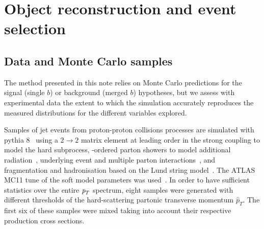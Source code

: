 %
%

\chapter{Object reconstruction and event selection}

\section{Data and Monte Carlo samples}\label{sec:Simulation}


The method presented in this note relies on Monte Carlo predictions for the signal (single $b$) or background (merged $b$) hypotheses, but we assess with experimental data the extent to which the simulation accurately reproduces the measured distributions for the different variables explored.

Samples of jet events from proton-proton collisions processes are simulated with {\sc pythia 8}~\cite{PYTHIA8} using a $2\rightarrow 2$ matrix element at leading order in the strong coupling to model the hard subprocess, \pt-ordered parton showers to model additional radiation~\cite{Pythia_partonshowers}, underlying event and multiple parton interactions~\cite{Pythia_mpi}, and fragmentation and hadronisation based on the Lund string model~\cite{Lund_string_model}. 
The ATLAS MC11 tune of the soft model parameters was used~\cite{Pythia_MC11tune}.
In order to have sufficient statistics over the entire ${\emph{p}_{T}}$ spectrum, eight samples were generated with different thresholds of the hard-scattering partonic transverse momentum $\hat{p}_T$. The first six of these samples were mixed taking into account their respective production cross sections.

